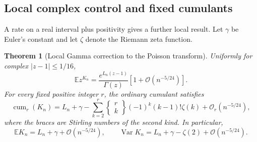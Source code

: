 \documentclass[11pt]{article}
\newtheorem{theorem}{Theorem}[section]
\theoremstyle{remark}\newtheorem{remark}[theorem]{Remark}
\newcommand{\OO}{\mathcal O}
\newcommand{\E}{\mathbb E}
\begin{document}
\subsection{Local complex control and fixed cumulants}\label{xtw:frac:sec:cumulants}
A rate on a real interval plus positivity gives a further local result.
Let $\gamma$ be Euler's constant and let $\zeta$ denote the Riemann zeta
function.
\begin{theorem}[Local Gamma correction to the Poisson transform]\label{xtw:frac:thm:modpoisson}
Uniformly for complex $|z-1|\le1/16$,
\begin{equation}\label{xtw:frac:eq:modpoisson}
 \E z^{K_n}=\frac{e^{L_n(z-1)}}{\Gamma(z)}
                                      [1+\OO(n^{-5/24})].
\end{equation}
For every fixed positive integer $r$, the ordinary cumulant satisfies
\begin{equation}\label{xtw:frac:eq:cumulants}
 \operatorname{cum}_r(K_n)=L_n+\gamma-
 \sum_{k=2}^r\left\{\!\begin{matrix}r\\k\end{matrix}\!\right\}
                 (-1)^k(k-1)!\zeta(k)+\OO_r(n^{-5/24}),
\end{equation}
where the braces are Stirling numbers of the second kind. In particular,
\begin{equation}\label{xtw:frac:eq:meanvariance}
 \E K_n=L_n+\gamma+\OO(n^{-5/24}),\qquad
 \operatorname{Var}K_n=L_n+\gamma-\zeta(2)+\OO(n^{-5/24}).
\end{equation}
\end{theorem}
\end{document}

